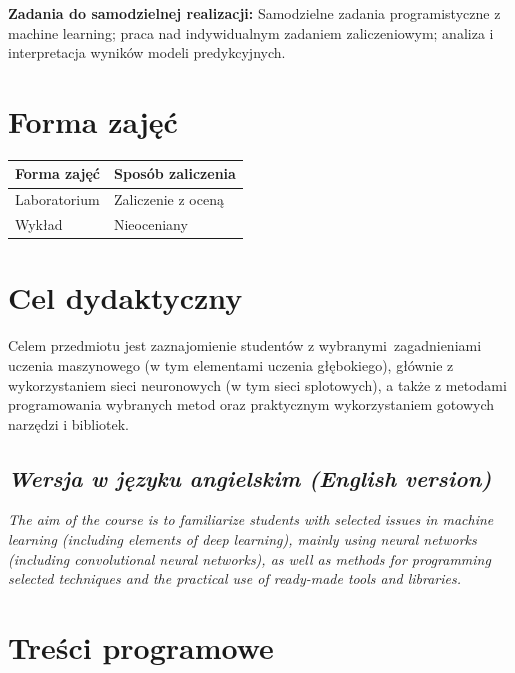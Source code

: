 \documentclass[12pt, a4paper]{article}
\begin{document}
\vspace{4pt}
\noindent\textbf{Zadania do samodzielnej realizacji:} Samodzielne zadania programistyczne z machine learning; praca nad indywidualnym zadaniem zaliczeniowym; analiza i interpretacja wyników modeli predykcyjnych.

\section{Forma zajęć}

\begin{tabular}{ll}
  \hline
  \textbf{Forma zajęć} & \textbf{Sposób zaliczenia} \\
  \hline
  Laboratorium & Zaliczenie z oceną \\
  Wykład & Nieoceniany \\
  \hline
\end{tabular}

\section{Cel dydaktyczny}

Celem przedmiotu jest zaznajomienie studentów z wybranymi zagadnieniami uczenia maszynowego (w tym elementami uczenia głębokiego), głównie z wykorzystaniem sieci neuronowych (w tym sieci splotowych), a także z metodami programowania wybranych metod oraz praktycznym wykorzystaniem gotowych narzędzi i bibliotek.

\subsection*{\textit{Wersja w języku angielskim (English version)}}

\textit{The aim of the course is to familiarize students with selected issues in machine learning (including elements of deep learning), mainly using neural networks (including convolutional neural networks), as well as methods for programming selected techniques and the practical use of ready-made tools and libraries.}


\section{Treści programowe}
\end{document}
